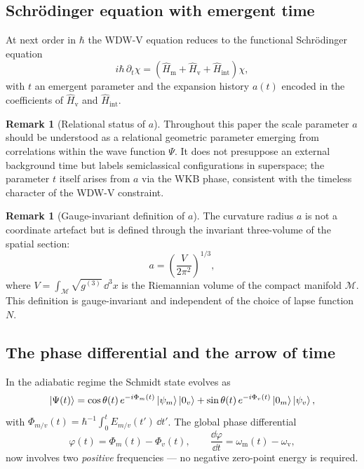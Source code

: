 \documentclass[12pt,a4paper]{article}
\theoremstyle{plain}
\theoremstyle{definition}
\newtheorem{remark}[theorem]{Remark}
\newcommand{\Hm}{\hat{H}_{\mathrm{m}}}
\newcommand{\Hv}{\hat{H}_{\mathrm{v}}}
\newcommand{\Hint}{\hat{H}_{\mathrm{int}}}
\newcommand{\omm}{\omega_{\mathrm{m}}}
\newcommand{\omv}{\omega_{\mathrm{v}}}
\newcommand{\Mth}{\mathcal{M}}
\begin{document}
\subsection{Schr\"odinger equation with emergent time}

At next order in $\hbar$ the WDW-V equation reduces to the functional
Schr\"odinger equation
\begin{equation}
  i\hbar\,\partial_t\chi = (\Hm + \Hv + \Hint)\chi,
  \label{eq:schrodinger_emergent}
\end{equation}
with $t$ an emergent parameter and the expansion history $a(t)$ encoded in
the coefficients of $\Hv$ and $\Hint$.

\begin{remark}[Relational status of $a$]
Throughout this paper the scale parameter $a$ should be understood as a
relational geometric parameter emerging from correlations within the wave
function $\Psi$. It does not presuppose an external background time but
labels semiclassical configurations in superspace; the parameter $t$ itself
arises from $a$ via the WKB phase, consistent with the timeless character
of the WDW-V constraint.
\end{remark}

\begin{remark}[Gauge-invariant definition of $a$]
\label{rem:gauge_invariant_a}
The curvature radius $a$ is not a coordinate artefact but is defined
through the invariant three-volume of the spatial section:
\begin{equation}
  a = \left(\frac{V}{2\pi^2}\right)^{\!1/3},
  \label{eq:a_from_volume}
\end{equation}
where $V = \int_{\Mth}\sqrt{g^{(3)}}\,\dd^3x$ is the Riemannian volume
of the compact manifold $\Mth$.
This definition is gauge-invariant and independent of the choice of
lapse function $N$.
\end{remark}

\subsection{The phase differential and the arrow of time}

In the adiabatic regime the Schmidt state evolves as
\begin{equation}
  \ket{\Psi(t)} = \cos\theta(t)\,e^{-i\Phi_m(t)}\ket{\psi_m}\ket{0_v}
                + \sin\theta(t)\,e^{-i\Phi_v(t)}\ket{0_m}\ket{\psi_v},
  \label{eq:adiabatic_state}
\end{equation}
with $\Phi_{m/v}(t) = \hbar^{-1}\int_0^t E_{m/v}(t')\,\dd t'$.
The global phase differential
\begin{equation}
  \varphi(t) = \Phi_m(t) - \Phi_v(t),
  \qquad
  \frac{\dd\varphi}{\dd t} = \omm(t) - \omv,
  \label{eq:phase_rate}
\end{equation}
now involves two \emph{positive} frequencies --- no negative zero-point
energy is required.
\end{document}
